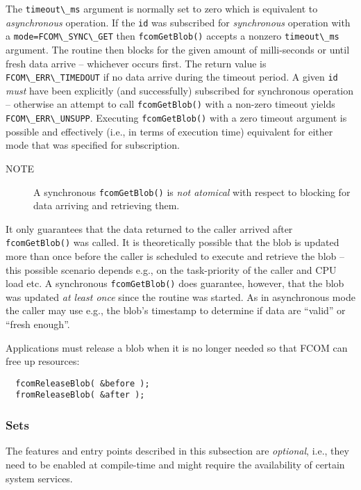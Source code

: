 \documentclass[11pt]{article}
\newcommand{\fcom}{FCOM}
\newcommand{\blob}{blob}
\newcommand{\cstl}[1]{{\lstinline+#1+}}
\newcommand{\note}[1]{
	\begin{description}
		\item[NOTE] #1
	\end{description}
}
\begin{document}
      The \cstl{timeout\_ms} argument is normally set to
      zero which is equivalent to {\em asynchronous} operation.
      If the \cstl{id} was subscribed for {\em synchronous}
      operation with a \cstl{mode=FCOM\_SYNC\_GET} then
      \cstl{fcomGetBlob()} accepts a nonzero \cstl{timeout\_ms}
      argument. The routine then blocks for the given amount
      of milli-seconds or until fresh data arrive -- whichever
      occurs first. The return value is \cstl{FCOM\_ERR\_TIMEDOUT}
      if no data arrive during the timeout period.
      A given \cstl{id} {\em must} have been explicitly (and
      successfully) subscribed for synchronous operation --
      otherwise an attempt to call \cstl{fcomGetBlob()} with
      a non-zero timeout yields \cstl{FCOM\_ERR\_UNSUPP}.
      Executing \cstl{fcomGetBlob()} with a zero timeout 
      argument is possible and effectively (i.e., in terms
      of execution time) equivalent for either mode that
      was specified for subscription.
      \note{A synchronous \cstl{fcomGetBlob()} is {\em
      not atomical} with respect to blocking for data arriving
      and retrieving them.}
      It only guarantees that the data
      returned to the caller arrived after \cstl{fcomGetBlob()}
      was called. It is theoretically possible that the blob
      is updated more than once before the caller is scheduled
      to execute and retrieve the blob -- this possible scenario
      depends e.g., on the task-priority of the caller and CPU
      load etc. A synchronous \cstl{fcomGetBlob()} does guarantee,
      however, that the blob was updated {\em at least once}
      since the routine was started. As in asynchronous mode
      the caller may use e.g., the blob's timestamp to determine
      if data are ``valid'' or ``fresh enough''.

      Applications must release a \blob{} when it
      is no longer needed so that \fcom{} can free
      up resources:

      \begin{verbatim}
  fcomReleaseBlob( &before );
  fromReleaseBlob( &after );
      \end{verbatim}

    \subsubsection{Sets}
      The features and entry points described in this subsection are {\em optional},
      i.e., they need to be enabled at compile-time and might require the availability
      of certain system services.
\end{document}
